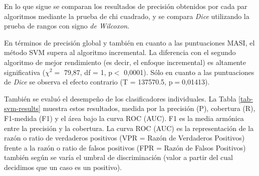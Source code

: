 

En lo que sigue se comparan los resultados de precisi\'on obtenidos por cada par algoritmos mediante la prueba de chi cuadrado, y se compara {\em Dice} utilizando la prueba de rangos con signo {\em de Wilcoxon}.

En t\'erminos de precisi\'on global y tambi\'en en cuanto a las puntuaciones MASI, el m\'etodo SVM supera al algoritmo incremental. La diferencia con el segundo algoritmo de mejor rendimiento (es decir, el enfoque incremental) es altamente significativa ($\chi^{2}=$ 79,87, df = 1, p$<$ 0,0001). S\'olo en cuanto a las puntuaciones de {\it Dice} se observa el efecto contrario (T = 137570.5, p$=$0,01413).

Tambi\'en se evalu\'o el desempe\~no de los clasificadores individuales. La Tabla \ref{tab-svm-results} muestra estos resultados, medida por la precisi\'on (P), cobertura (R), F1-medida (F1) y el \'area bajo la curva ROC (AUC). F1 es la media arm\'onica entre la precisi\'on y la cobertura. La curva ROC (AUC) es la representaci\'on de la raz\'on o ratio de verdaderos positivos (VPR = Raz\'on de Verdaderos Positivos) frente a la raz\'on o ratio de falsos positivos (FPR = Raz\'on de Falsos Positivos) tambi\'en seg\'un se var\'ia el umbral de discriminaci\'on (valor a partir del cual decidimos que un caso es un positivo).

